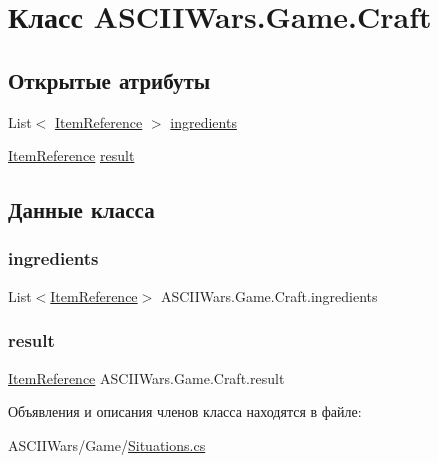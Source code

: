 \hypertarget{class_a_s_c_i_i_wars_1_1_game_1_1_craft}{}\section{Класс A\+S\+C\+I\+I\+Wars.\+Game.\+Craft}
\label{class_a_s_c_i_i_wars_1_1_game_1_1_craft}
\subsection*{Открытые атрибуты}
\begin{DoxyCompactItemize}
\item 
List$<$ \hyperlink{class_a_s_c_i_i_wars_1_1_game_1_1_item_reference}{Item\+Reference} $>$ \hyperlink{class_a_s_c_i_i_wars_1_1_game_1_1_craft_a6b86d118ec73cfaa9f14db2b427f85d6}{ingredients}
\item 
\hyperlink{class_a_s_c_i_i_wars_1_1_game_1_1_item_reference}{Item\+Reference} \hyperlink{class_a_s_c_i_i_wars_1_1_game_1_1_craft_a536acdce2b02e8d23fb9c3472380ad9e}{result}
\end{DoxyCompactItemize}


\subsection{Данные класса}
\hypertarget{class_a_s_c_i_i_wars_1_1_game_1_1_craft_a6b86d118ec73cfaa9f14db2b427f85d6}{}\label{class_a_s_c_i_i_wars_1_1_game_1_1_craft_a6b86d118ec73cfaa9f14db2b427f85d6} 
\subsubsection{\texorpdfstring{ingredients}{ingredients}}
{\footnotesize\ttfamily List$<$\hyperlink{class_a_s_c_i_i_wars_1_1_game_1_1_item_reference}{Item\+Reference}$>$ A\+S\+C\+I\+I\+Wars.\+Game.\+Craft.\+ingredients}

\hypertarget{class_a_s_c_i_i_wars_1_1_game_1_1_craft_a536acdce2b02e8d23fb9c3472380ad9e}{}\label{class_a_s_c_i_i_wars_1_1_game_1_1_craft_a536acdce2b02e8d23fb9c3472380ad9e} 
\subsubsection{\texorpdfstring{result}{result}}
{\footnotesize\ttfamily \hyperlink{class_a_s_c_i_i_wars_1_1_game_1_1_item_reference}{Item\+Reference} A\+S\+C\+I\+I\+Wars.\+Game.\+Craft.\+result}



Объявления и описания членов класса находятся в файле\+:\begin{DoxyCompactItemize}
\item 
A\+S\+C\+I\+I\+Wars/\+Game/\hyperlink{_situations_8cs}{Situations.\+cs}\end{DoxyCompactItemize}
